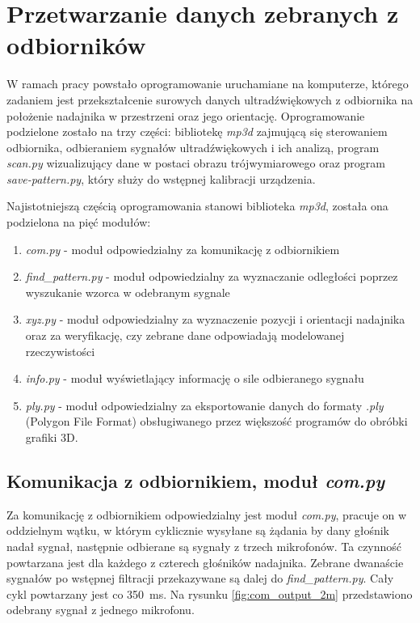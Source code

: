 \chapter{Przetwarzanie danych zebranych z odbiorników}

W ramach pracy powstało oprogramowanie uruchamiane na komputerze, którego zadaniem jest
przekształcenie surowych danych ultradźwiękowych 
z odbiornika na położenie nadajnika w przestrzeni oraz jego orientację.
Oprogramowanie podzielone zostało na trzy części: bibliotekę \textit{mp3d} zajmującą się
sterowaniem odbiornika, odbieraniem sygnałów ultradźwiękowych i ich analizą, program \textit{scan.py}
wizualizujący dane w postaci obrazu trójwymiarowego oraz program \textit{save-pattern.py},
który służy do wstępnej kalibracji urządzenia.


Najistotniejszą częścią oprogramowania stanowi biblioteka \textit{mp3d}, została ona podzielona na pięć modułów:
\begin{enumerate}
 \item \textit{com.py} - moduł odpowiedzialny za komunikację z odbiornikiem
 \item \textit{find\_pattern.py} - moduł odpowiedzialny za wyznaczanie odległości poprzez wyszukanie wzorca w odebranym sygnale
 \item \textit{xyz.py} - moduł odpowiedzialny za wyznaczenie pozycji i orientacji nadajnika oraz za 
 weryfikację, czy zebrane dane odpowiadają modelowanej rzeczywistości
 \item \textit{info.py} - moduł wyświetlający informację o sile odbieranego sygnału
 \item \textit{ply.py} - moduł odpowiedzialny za eksportowanie danych do formaty \textit{.ply} 
    (Polygon File Format) obsługiwanego przez większość programów do obróbki grafiki 3D.
\end{enumerate}


\section{Komunikacja z odbiornikiem, moduł \textit{com.py}}

Za komunikację z odbiornikiem odpowiedzialny jest moduł \textit{com.py},
pracuje on w oddzielnym wątku, w którym cyklicznie wysyłane są żądania by dany głośnik nadał sygnał,
następnie odbierane są sygnały z trzech mikrofonów.
Ta czynność powtarzana jest dla każdego z czterech głośników nadajnika.
Zebrane dwanaście sygnałów po wstępnej filtracji przekazywane są dalej do \textit{find\_pattern.py}. Cały cykl powtarzany jest
co \SI{350}{ms}. Na rysunku \ref{fig:com_output_2m} przedstawiono odebrany sygnał z jednego mikrofonu.


